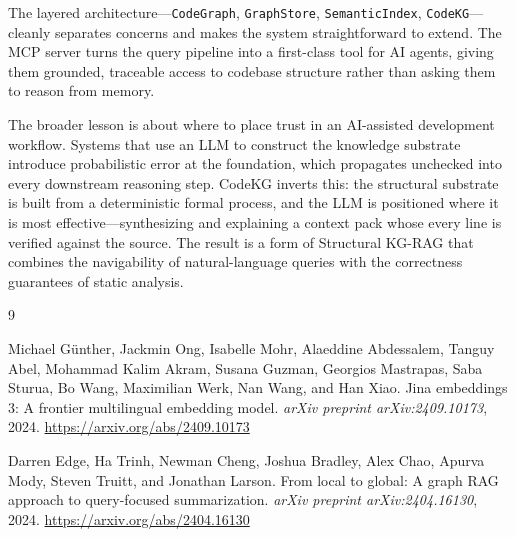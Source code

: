 \documentclass[10pt]{article}
\begin{document}
The layered architecture---\texttt{CodeGraph}, \texttt{GraphStore},
\texttt{SemanticIndex}, \texttt{CodeKG}---cleanly separates concerns and makes the
system straightforward to extend. The MCP server turns the query pipeline into a
first-class tool for AI agents, giving them grounded, traceable access to codebase
structure rather than asking them to reason from memory.

The broader lesson is about where to place trust in an AI-assisted development
workflow. Systems that use an LLM to construct the knowledge substrate introduce
probabilistic error at the foundation, which propagates unchecked into every
downstream reasoning step. CodeKG inverts this: the structural substrate is built
from a deterministic formal process, and the LLM is positioned where it is most
effective---synthesizing and explaining a context pack whose every line is verified
against the source. The result is a form of Structural KG-RAG that combines the
navigability of natural-language queries with the correctness guarantees of static
analysis.

\begin{thebibliography}{9}

Michael Günther, Jackmin Ong, Isabelle Mohr, Alaeddine Abdessalem,
Tanguy Abel, Mohammad Kalim Akram, Susana Guzman, Georgios Mastrapas,
Saba Sturua, Bo Wang, Maximilian Werk, Nan Wang, and Han Xiao.
\newblock Jina embeddings 3: A frontier multilingual embedding model.
\newblock \emph{arXiv preprint arXiv:2409.10173}, 2024.
\newblock \url{https://arxiv.org/abs/2409.10173}

Darren Edge, Ha Trinh, Newman Cheng, Joshua Bradley, Alex Chao, Apurva Mody,
Steven Truitt, and Jonathan Larson.
\newblock From local to global: A graph {RAG} approach to query-focused
summarization.
\newblock \emph{arXiv preprint arXiv:2404.16130}, 2024.
\newblock \url{https://arxiv.org/abs/2404.16130}

\end{thebibliography}
\end{document}
